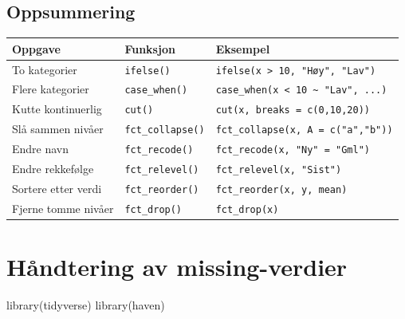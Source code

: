 \documentclass[
  norsk,
  letterpaper,
  DIV=11,
  numbers=noendperiod]{scrreprt}
\newenvironment{Shaded}{\begin{snugshade}}{\end{snugshade}}
\newcommand{\FunctionTok}[1]{\textcolor[rgb]{0.28,0.35,0.67}{#1}}
\newcommand{\NormalTok}[1]{\textcolor[rgb]{0.00,0.23,0.31}{#1}}
\theoremstyle{definition}
\theoremstyle{remark}
\begin{document}
\section{Oppsummering}\label{oppsummering-9}

\begin{longtable}[]{@{}
  >{\raggedright\arraybackslash}p{}
  >{\raggedright\arraybackslash}p{}
  >{\raggedright\arraybackslash}p{}@{}}
\toprule\noalign{}
\begin{minipage}[b]{\linewidth}\raggedright
Oppgave
\end{minipage} & \begin{minipage}[b]{\linewidth}\raggedright
Funksjon
\end{minipage} & \begin{minipage}[b]{\linewidth}\raggedright
Eksempel
\end{minipage} \\
\midrule\noalign{}
\endhead
\bottomrule\noalign{}
\endlastfoot
To kategorier & \texttt{ifelse()} &
\texttt{ifelse(x\ \textgreater{}\ 10,\ "Høy",\ "Lav")} \\
Flere kategorier & \texttt{case\_when()} &
\texttt{case\_when(x\ \textless{}\ 10\ \textasciitilde{}\ "Lav",\ ...)} \\
Kutte kontinuerlig & \texttt{cut()} &
\texttt{cut(x,\ breaks\ =\ c(0,10,20))} \\
Slå sammen nivåer & \texttt{fct\_collapse()} &
\texttt{fct\_collapse(x,\ A\ =\ c("a","b"))} \\
Endre navn & \texttt{fct\_recode()} &
\texttt{fct\_recode(x,\ "Ny"\ =\ "Gml")} \\
Endre rekkefølge & \texttt{fct\_relevel()} &
\texttt{fct\_relevel(x,\ "Sist")} \\
Sortere etter verdi & \texttt{fct\_reorder()} &
\texttt{fct\_reorder(x,\ y,\ mean)} \\
Fjerne tomme nivåer & \texttt{fct\_drop()} & \texttt{fct\_drop(x)} \\
\end{longtable}

\chapter{Håndtering av
missing-verdier}\label{huxe5ndtering-av-missing-verdier}

\begin{Shaded}
\begin{Highlighting}[]
\FunctionTok{library}\NormalTok{(tidyverse)}
\FunctionTok{library}\NormalTok{(haven)}
\end{Highlighting}
\end{Shaded}
\end{document}
